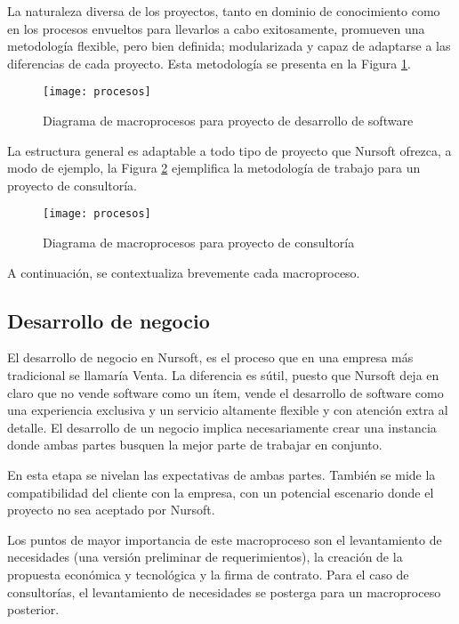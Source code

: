 \newpage 

La naturaleza diversa de los proyectos, tanto en dominio de conocimiento como en los procesos envueltos para 
llevarlos a cabo exitosamente, promueven una metodología flexible, pero bien definida; modularizada
y capaz de adaptarse a las diferencias de cada proyecto. Esta metodología se presenta en la Figura \ref{fig:procesos}.


\begin{figure}[h]
    \centering
    \texttt{[image: procesos]}
    \caption{Diagrama de macroprocesos para proyecto de desarrollo de software}
    \label{fig:procesos}
\end{figure}

La estructura general es adaptable a todo tipo de proyecto que Nursoft ofrezca, a modo de ejemplo, la Figura \ref{fig:consultoria}
ejemplifica la metodología de trabajo para un proyecto de consultoría.

\begin{figure}[h]
    \centering
    \texttt{[image: procesos]}
    \caption{Diagrama de macroprocesos para proyecto de consultoría}
    \label{fig:consultoria}
\end{figure}


A continuación, se contextualiza brevemente cada macroproceso.

\subsection{Desarrollo de negocio}

El desarrollo de negocio en Nursoft, es el proceso que en una empresa más tradicional se llamaría Venta.
La diferencia es sútil, puesto que Nursoft deja en claro que no vende software como un ítem, vende el desarrollo
de software como una experiencia exclusiva y un servicio altamente flexible y con atención extra al detalle. 
El desarrollo de un negocio implica necesariamente crear una instancia donde ambas partes busquen la mejor parte de
trabajar en conjunto.

En esta etapa se nivelan las expectativas de ambas partes. También se mide la
compatibilidad del cliente con la empresa, con un potencial escenario donde el proyecto no sea aceptado por Nursoft.

Los puntos de mayor importancia de este macroproceso son el levantamiento de necesidades (una versión preliminar de requerimientos),
la creación de la propuesta económica y tecnológica y la firma de contrato. Para el caso de consultorías,
el levantamiento de necesidades se posterga para un macroproceso posterior.


